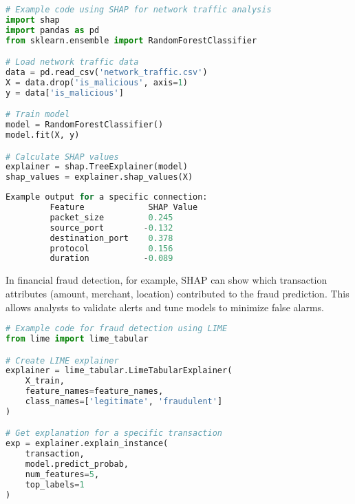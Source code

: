 \documentclass[12pt]{article}
\begin{document}
\begin{tcolorbox}[colback=black!90!white, colframe=orange!40!black, title=Example Code for Model Robustness Testing, coltext=white]
    \begin{lstlisting}[language=Python, basicstyle=\ttfamily\color{white}, keywordstyle=\color{cyan}, commentstyle=\color{blue}, stringstyle=\color{yellow}]
# Example code using SHAP for network traffic analysis
import shap
import pandas as pd
from sklearn.ensemble import RandomForestClassifier

# Load network traffic data
data = pd.read_csv('network_traffic.csv')
X = data.drop('is_malicious', axis=1)
y = data['is_malicious']

# Train model
model = RandomForestClassifier()
model.fit(X, y)

# Calculate SHAP values
explainer = shap.TreeExplainer(model)
shap_values = explainer.shap_values(X)

    \end{lstlisting}
\end{tcolorbox}


\begin{tcolorbox}[colback=black!90!white, colframe=orange!40!black, title=Example Code for Model Robustness Testing, coltext=white]
    \begin{lstlisting}[language=Python, basicstyle=\ttfamily\color{white}, keywordstyle=\color{cyan}, commentstyle=\color{blue}, stringstyle=\color{yellow}]
         Example output for a specific connection:
         Feature             SHAP Value
         packet_size         0.245
         source_port        -0.132 
         destination_port    0.378
         protocol            0.156
         duration           -0.089
    \end{lstlisting}
\end{tcolorbox}

In financial fraud detection, for example, SHAP can show which transaction attributes (amount, merchant, location) contributed to the fraud prediction. This allows analysts to validate alerts and tune models to minimize false alarms.

\begin{tcolorbox}[colback=black!90!white, colframe=orange!40!black, title=Example Code for Model Robustness Testing, coltext=white]
    \begin{lstlisting}[language=Python, basicstyle=\ttfamily\color{white}, keywordstyle=\color{cyan}, commentstyle=\color{blue}, stringstyle=\color{yellow}]
# Example code for fraud detection using LIME
from lime import lime_tabular

# Create LIME explainer
explainer = lime_tabular.LimeTabularExplainer(
    X_train,
    feature_names=feature_names,
    class_names=['legitimate', 'fraudulent']
)

# Get explanation for a specific transaction
exp = explainer.explain_instance(
    transaction,
    model.predict_probab,
    num_features=5,
    top_labels=1
)
\end{lstlisting}
\end{tcolorbox}
    
\end{document}
